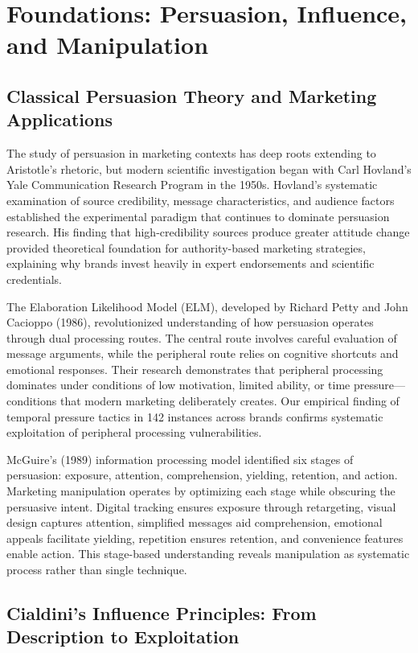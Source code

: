 \section{Foundations: Persuasion, Influence, and Manipulation}
\label{sec:foundations}

\subsection{Classical Persuasion Theory and Marketing Applications}

The study of persuasion in marketing contexts has deep roots extending to Aristotle's rhetoric, but modern scientific investigation began with Carl Hovland's Yale Communication Research Program in the 1950s. Hovland's systematic examination of source credibility, message characteristics, and audience factors established the experimental paradigm that continues to dominate persuasion research. His finding that high-credibility sources produce greater attitude change provided theoretical foundation for authority-based marketing strategies, explaining why brands invest heavily in expert endorsements and scientific credentials.

The Elaboration Likelihood Model (ELM), developed by Richard Petty and John Cacioppo (1986), revolutionized understanding of how persuasion operates through dual processing routes. The central route involves careful evaluation of message arguments, while the peripheral route relies on cognitive shortcuts and emotional responses. Their research demonstrates that peripheral processing dominates under conditions of low motivation, limited ability, or time pressure—conditions that modern marketing deliberately creates. Our empirical finding of temporal pressure tactics in 142 instances across brands confirms systematic exploitation of peripheral processing vulnerabilities.

McGuire's (1989) information processing model identified six stages of persuasion: exposure, attention, comprehension, yielding, retention, and action. Marketing manipulation operates by optimizing each stage while obscuring the persuasive intent. Digital tracking ensures exposure through retargeting, visual design captures attention, simplified messages aid comprehension, emotional appeals facilitate yielding, repetition ensures retention, and convenience features enable action. This stage-based understanding reveals manipulation as systematic process rather than single technique.

\subsection{Cialdini's Influence Principles: From Description to Exploitation}

